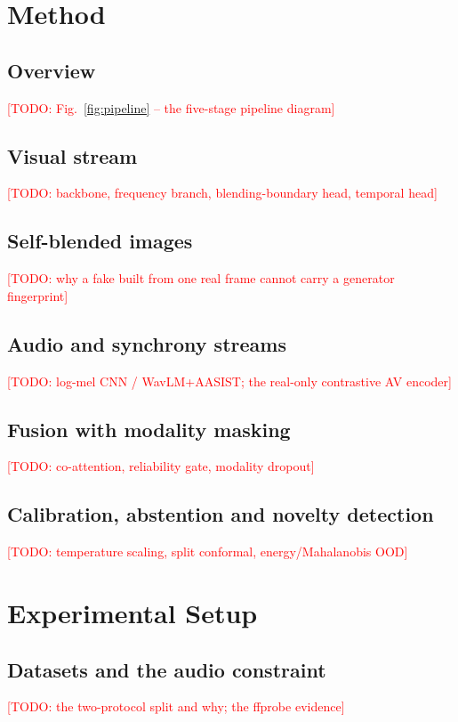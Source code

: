 \documentclass[conference]{IEEEtran}
\newcommand{\todo}[1]{\textcolor{red}{[TODO: #1]}}
\begin{document}
\section{Method}

\subsection{Overview}
\todo{Fig.~\ref{fig:pipeline} -- the five-stage pipeline diagram}

\subsection{Visual stream}
\todo{backbone, frequency branch, blending-boundary head, temporal head}

\subsection{Self-blended images}
\todo{why a fake built from one real frame cannot carry a generator fingerprint}

\subsection{Audio and synchrony streams}
\todo{log-mel CNN / WavLM+AASIST; the real-only contrastive AV encoder}

\subsection{Fusion with modality masking}
\todo{co-attention, reliability gate, modality dropout}

\subsection{Calibration, abstention and novelty detection}
\todo{temperature scaling, split conformal, energy/Mahalanobis OOD}

\section{Experimental Setup}

\subsection{Datasets and the audio constraint}
\todo{the two-protocol split and why; the ffprobe evidence}
\end{document}
